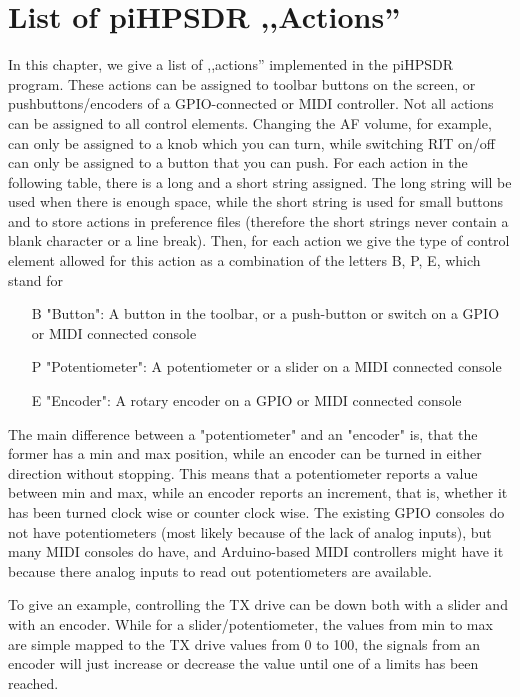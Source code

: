 \documentclass[12pt]{book}
\begin{document}
\appendix
\chapter{List of piHPSDR ,,Actions''}

In this chapter, we give a list of ,,actions'' implemented in the piHPSDR program. These actions can be assigned to
toolbar buttons on the screen, or pushbuttons/encoders of a GPIO-connected or MIDI controller. Not all actions can
be assigned to all control elements. Changing the AF volume, for example, can only be assigned to a knob which
you can turn, while switching RIT on/off can only be assigned to a button that you can push. For each action
in the following table, there is a long and a short string assigned. The long string will be used when there is
enough space, while the short string is used for small buttons and to store actions in preference files (therefore
the short strings never contain a blank character or a line break). Then, for each action we give the type of control
element allowed for this action as a combination of the letters B, P, E, which stand for

\begin{itemize}[font=\texttt, left=0pt]
\item[B] {"Button": A button in the toolbar, or a push-button or switch on a GPIO or MIDI connected console}
\item[P] {"Potentiometer": A potentiometer or a slider on a MIDI connected console}
\item[E] {"Encoder": A rotary encoder on a GPIO or MIDI connected console}
\end{itemize}

The main difference between a "potentiometer" and an "encoder" is, that the former has a min and max position, while
an encoder can be turned in either direction without stopping. This means that a potentiometer
reports a value between min and max, while an encoder reports an increment,
that is, whether it has been turned clock wise or counter clock wise.
The existing GPIO consoles do not have potentiometers (most likely because of the lack of analog inputs), but
many MIDI consoles do have, and Arduino-based MIDI controllers might have it because there analog inputs
to read out potentiometers are available.

To give an example, controlling the TX drive can be down both with a slider and with an encoder. While for
a slider/potentiometer, the values from min to max are simple mapped to the TX drive values from 0 to 100,
the signals from an encoder will just increase or decrease the value until one of a limits has been reached.
\end{document}
